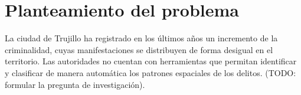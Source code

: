 
\section{Planteamiento del problema}

\label{sec:planteamiento}

La ciudad de Trujillo ha registrado en los últimos años un incremento
de la criminalidad, cuyas manifestaciones se distribuyen de forma
desigual en el territorio. Las autoridades no cuentan con herramientas
que permitan identificar y clasificar de manera automática los patrones
espaciales de los delitos. (TODO: formular la pregunta de investigación).
